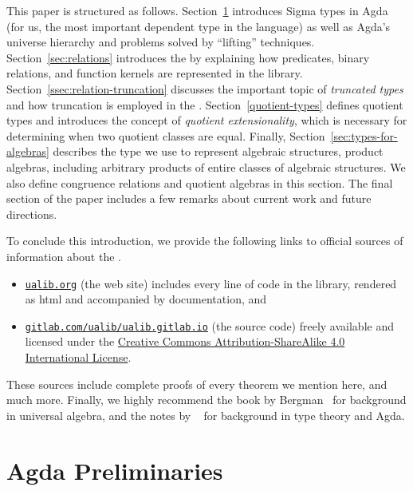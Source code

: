 \documentclass[a4paper,UKenglish,cleveref,autoref,thm-restate,11pt]{lipics-v2021}
\begin{document}
This paper is structured as follows.
%
Section~\ref{sec:agda-preliminaries} introduces Sigma types in Agda (for us, the most important dependent type in the language) as well as Agda's universe hierarchy and problems solved by ``lifting'' techniques.
%
Section~\ref{sec:relations} introduces the \agdaualib by explaining how predicates, binary relations, and function kernels are represented in the library. 
%
Section~\ref{ssec:relation-truncation} discusses the important topic of \emph{truncated types} and how truncation is employed in the \ualib.
%
Section~\ref{quotient-types} defines quotient types and introduces the concept of \emph{quotient extensionality}, which is necessary for determining when two quotient classes are equal.
%
Finally, Section~\ref{sec:types-for-algebras} describes the type we use to represent algebraic structures, product algebras, including arbitrary products of entire classes of algebraic structures.  We also define congruence relations and quotient algebras in this section.
%
%
The final section of the paper includes a few remarks about current work and future directions.

To conclude this introduction, we provide the following links to official sources of information about the \agdaualib.
\begin{itemize}
  \item \href{https://ualib.gitlab.io}{\texttt{ualib.org}} (the web site) includes every line of code in the library, rendered as html and accompanied by documentation, and
  \item \href{https://gitlab.com/ualib/ualib.gitlab.io}{\texttt{gitlab.com/ualib/ualib.gitlab.io}} (the source code) freely available and licensed under the \href{https://creativecommons.org/licenses/by-sa/4.0/}{Creative Commons Attribution-ShareAlike 4.0 International License}.
\end{itemize}
These sources include complete proofs of every theorem we mention here, and much more. Finally, we highly recommend the book by Bergman~\cite{Bergman:2012} for background in universal algebra, and the notes by \escardo~\cite{MHE} for background in type theory and Agda.



\section{Agda Preliminaries}\label{sec:agda-preliminaries}
\end{document}
